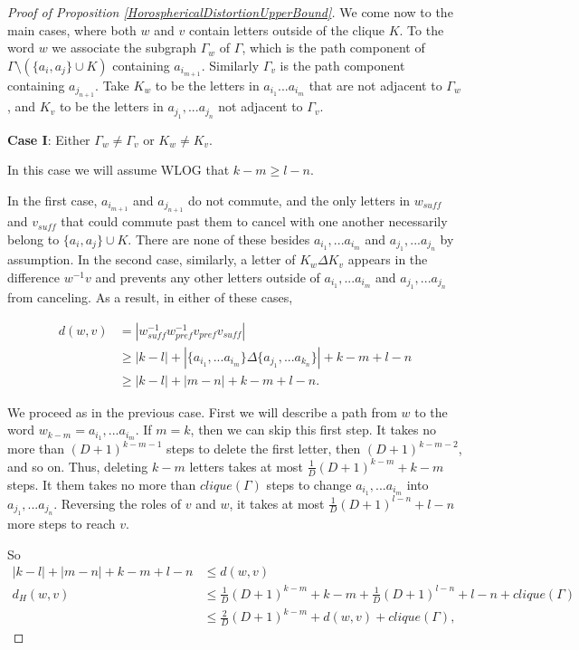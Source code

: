 \documentclass[10pt,a4paper]{amsart}
\theoremstyle{definition}
\theoremstyle{remark}
\begin{document}
\begin{proof} [Proof of Proposition \ref{HorosphericalDistortionUpperBound}]
		We come now to the main cases, where both $w$ and $v$ contain letters outside of the clique $K$. To the word $w$ we associate the subgraph $\Gamma_w$ of $\Gamma$, which is the path component of $\Gamma\setminus(\{a_i, a_j\}\cup K)$ containing $a_{i_{m+1}}$. Similarly $\Gamma_v$ is the path component containing $a_{j_{n+1}}$. Take $K_w$ to be the letters in $a_{i_1} ... a_{i_m}$ that are not adjacent to $\Gamma_w$, and $K_v$ to be the letters in $a_{j_1}, ... a_{j_n}$ not adjacent to $\Gamma_v$.
		
		\textbf{Case I}: Either $\Gamma_w\ne \Gamma_v$ or $K_w\ne K_v$.
		
		In this case we will assume WLOG that $k-m\ge l-n$.
		
		In the first case, $a_{i_{m+1}}$ and $a_{j_{n+1}}$ do not commute, and the only letters in $w_{suff}$ and $v_{suff}$ that could commute past them to cancel with one another necessarily belong to $\{a_i, a_j\}\cup K$. There are none of these besides $a_{i_1}, ... a_{i_m}$ and $a_{j_1}, ... a_{j_n}$ by assumption. In the second case, similarly, a letter of $K_w\Delta K_v$ appears in the difference $w^{-1}v$ and prevents any other letters outside of $a_{i_1}, ... a_{i_m}$ and $a_{j_1}, ... a_{j_n}$ from canceling. As a result, in either of these cases,
		
		\begin{align*}
		d(w,v)&=|w_{suff}^{-1}w_{pref}^{-1}v_{pref}v_{suff}|\\
		&\ge|k-l|+|\{a_{i_1}, ... a_{i_m}\}\Delta \{a_{j_1}, ... a_{k_n}\}|+k-m+l-n\\
		&\ge |k-l|+|m-n| +k-m+l-n.
		\end{align*}
		
		We proceed as in the previous case. First we will describe a path from $w$ to the word $w_{k-m}=a_{i_1},... a_{i_m}$. If $m=k$, then we can skip this first step. It takes no more than \newline $(D+1)^{k-m-1}$ steps to delete the first letter, then $(D+1)^{k-m-2}$, and so on. Thus, deleting $k-m$ letters takes at most $\frac{1}{D}(D+1)^{k-m}+k-m$ steps. It them takes no more than $clique(\Gamma)$ steps to change $a_{i_1}, ... a_{i_m}$ into $a_{j_1}, ... a_{j_n}$. Reversing the roles of $v$ and $w$, it takes at most $\frac{1}{D}(D+1)^{l-n}+l-n$ more steps to reach $v$.
		
		So 
		\begin{align}
			|k-l|+|m-n| +k-m+l-n&\le d(w,v)\\
			d_H(w,v)&\le \frac{1}{D}(D+1)^{k-m}+k-m+\frac{1}{D}(D+1)^{l-n}+l-n + clique(\Gamma)\\
			&\le \frac{2}{D}(D+1)^{k-m}+d(w,v)+ clique(\Gamma),
		\end{align}
		

\end{proof}
\end{document}
